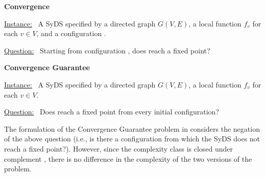 \smallskip
\noindent
\textbf{Convergence} %

\smallskip
\noindent
\underline{\textsf{Instance:}}~ A SyDS \cals{} specified 
by a directed graph $G(V,E)$, a local function $f_v$ 
for each $v \in V$, and a configuration \calc{}. 

\noindent
\underline{\textsf{Question:}}~ Starting from configuration \calc,
does  \cals{} reach a fixed point? 




\smallskip
\noindent
\textbf{Convergence Guarantee} %

\smallskip
\noindent
\underline{\textsf{Instance:}}~ A SyDS \cals{} specified 
by a directed
graph $G(V,E)$, a local function $f_v$ for each $v \in V$. 

\noindent
\underline{\textsf{Question:}}~ Does \cals{} reach a fixed point from
every initial configuration?

The formulation of the Convergence Guarantee problem 
in \cite{Chistikov-etal-2020} considers the negation of the above
question (i.e., is there a configuration \calc{} from which
the SyDS does not reach a fixed point?).
However, since the complexity class \cpsp{} is closed under
complement \cite{Papadimitriou-1993}, there is no difference in
the complexity of the two versions of the problem.
